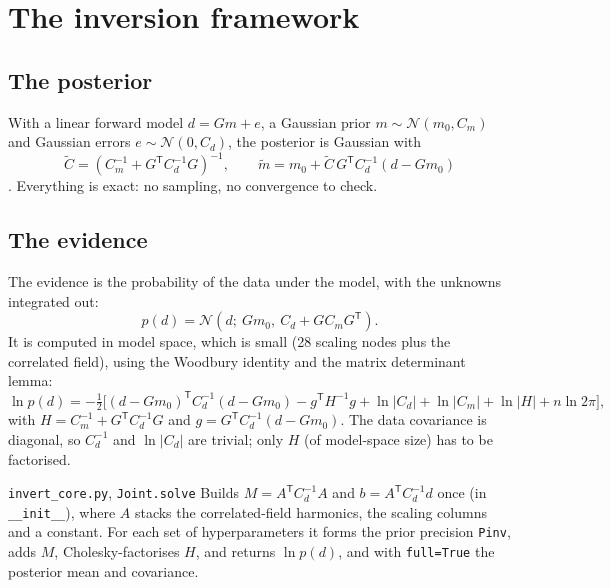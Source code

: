 \chapter{The inversion framework}
\label{ch:inversion}

\section{The posterior}

With a linear forward model $d = Gm + e$, a Gaussian prior $m\sim\mathcal N(m_0, C_m)$ and Gaussian errors $e\sim\mathcal N(0, C_d)$, the posterior is Gaussian with
\begin{equation}
    \tilde C = \left(C_m^{-1} + G^{\mathsf T}C_d^{-1}G\right)^{-1},
    \qquad
    \tilde m = m_0 + \tilde C\,G^{\mathsf T}C_d^{-1}(d - Gm_0)
\end{equation}
\citep{tarantola_inverse_2005}.
Everything is exact: no sampling, no convergence to check.

\section{The evidence}

The evidence is the probability of the data under the model, with the unknowns integrated out:
\begin{equation}
    p(d) = \mathcal N\!\left(d;\ Gm_0,\ C_d + G C_m G^{\mathsf T}\right).
\end{equation}
It is computed in model space, which is small (28 scaling nodes plus the correlated field), using the Woodbury identity and the matrix determinant lemma:
\[
    \ln p(d) = -\tfrac12\Big[(d-Gm_0)^{\mathsf T}C_d^{-1}(d-Gm_0) - g^{\mathsf T}H^{-1}g
    + \ln|C_d| + \ln|C_m| + \ln|H| + n\ln 2\pi\Big],
\]
with $H = C_m^{-1} + G^{\mathsf T}C_d^{-1}G$ and $g = G^{\mathsf T}C_d^{-1}(d-Gm_0)$.
The data covariance is diagonal, so $C_d^{-1}$ and $\ln|C_d|$ are trivial; only $H$ (of model-space size) has to be factorised.

\begin{incode}{\texttt{invert\_core.py}, \texttt{Joint.solve}}
Builds $M = A^{\mathsf T}C_d^{-1}A$ and $b = A^{\mathsf T}C_d^{-1}d$ once (in \texttt{\_\_init\_\_}), where $A$ stacks the correlated-field harmonics, the scaling columns and a constant.
For each set of hyperparameters it forms the prior precision \texttt{Pinv}, adds $M$, Cholesky-factorises $H$, and returns $\ln p(d)$, and with \texttt{full=True} the posterior mean and covariance.
\end{incode}

